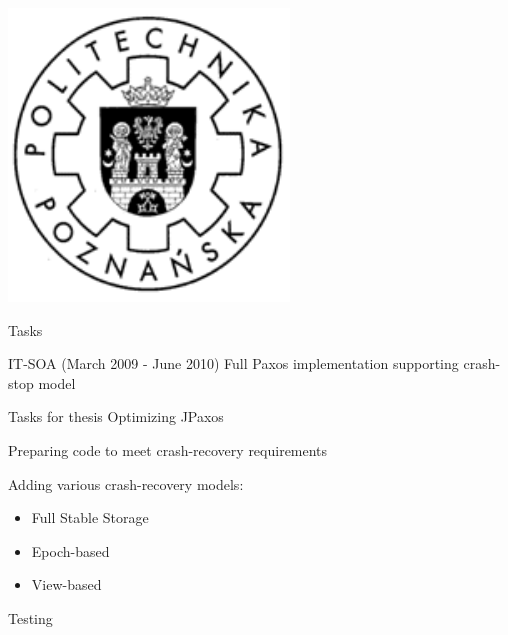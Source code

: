 \documentclass[hyperref={pdfpagelabels=true},11pt,compress,trans]{beamer}
\begin{document}
  \logo
  {
    \includegraphics[keepaspectratio,height=0.12\textheight]{images/put_logo.pdf} \hspace*{1em}
  }

\begin{frame}{Tasks}
 \begin{block}{IT-SOA (March 2009 - June 2010)}
  Full Paxos implementation supporting crash-stop model
 \end{block}

 \begin{block}{Tasks for thesis}
  Optimizing JPaxos
  
  Preparing code to meet crash-recovery requirements
  
  Adding various crash-recovery models: \vspace{-\parsep}
  \begin{itemize} 
   \item Full Stable Storage
   \item Epoch-based
   \item View-based
  \end{itemize}

  Testing
 \end{block}
\end{frame}
\end{document}
